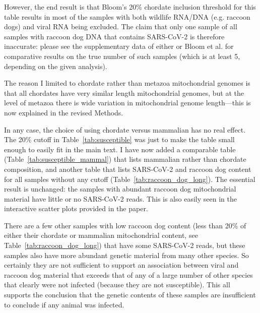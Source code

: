 \documentclass[9pt,twocolumn,twoside]{gsajnl_modified}
\begin{document}
\begin{enumerate}
However, the end result is that Bloom’s 20\% chordate inclusion threshold for this table results in most of the samples with both wildlife RNA/DNA (e.g. raccoon dogs) and viral RNA being excluded. The claim that only one sample of all samples with raccoon dog DNA that contains SARS-CoV-2 is therefore inaccurate: please see the supplementary data of either \citet{crits2023genetic} or Bloom et al. for comparative results on the true number of such samples (which is at least 5, depending on the given analysis).

{\color{black}
The reason I limited to chordate rather than metazoa mitochondrial genomes is that all chordates have very similar length mitochondrial genomes, but at the level of metazoa there is wide variation in mitochondrial genome length---this is now explained in the revised Methods.

In any case, the choice of using chordate versus mammalian has no real effect.
The 20\% cutoff in Table~\ref{tab:susceptible} was just to make the table small enough to easily fit in the main text.
I have now added a comparable table (Table~\ref{tab:susceptible_mammal}) that lists mammalian rather than chordate composition, and another table that lists SARS-CoV-2 and raccoon dog content for all samples without any cutoff (Table~\ref{tab:raccoon_dog_long}).
The essential result is unchanged: the samples with abundant raccoon dog mitochondrial material have little or no SARS-CoV-2 reads.
This is also easily seen in the interactive scatter plots provided in the paper.

There are a few other samples with low raccoon dog content (less than 20\% of either their chordate or mammalian mitochondrial content, see Table~\ref{tab:raccoon_dog_long}) that have some SARS-CoV-2 reads, but these samples also have more abundant genetic material from many other species.
So certainly they are not sufficient to support an association between viral and raccoon dog material that exceeds that of any of a large number of other species that clearly were not infected (because they are not susceptible).
This all supports the conclusion that the genetic contents of these samples are insufficient to conclude if any animal was infected.
}


\end{enumerate}
\end{document}
